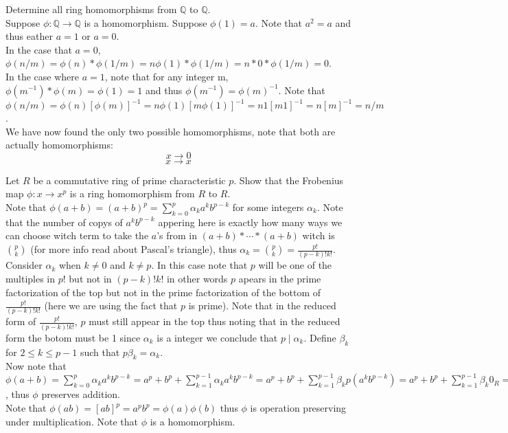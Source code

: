 \documentclass[12pt]{article}
\makeatletter
\theoremstyle{homework}
\newenvironment{exercise}[1]
{\def\@currentlabel{#1}\exercisecore}
{\endexercisecore}
\makeatother
\begin{document}
\begin{exercise}{15.42}
Determine all ring homomorphisms from $\mathbb{Q}$ to $\mathbb{Q}$.\\
Suppose $\phi:\mathbb{Q}\rightarrow\mathbb{Q}$ is a homomorphism.  Suppose $\phi(1)=a$.  Note that $a^2=a$ and thus eather $a=1$ or $a=0$.\\
In the case that $a=0$, $\phi(n/m)=\phi(n)*\phi(1/m)=n\phi(1)*\phi(1/m)=n*0*\phi(1/m)=0$.\\
In the case where $a=1$, note that for any integer m, $\phi(m^{-1})*\phi(m)=\phi(1)=1$ and thus $\phi(m^{-1})=\phi(m)^{-1}$.  Note that $\phi(n/m)=\phi(n)[\phi(m)]^{-1}=n\phi(1)[m\phi(1)]^{-1}=n1[m1]^{-1}=n[m]^{-1}=n/m$.\\
We have now found the only two possible homomorphisms, note that both are actually homomorphisms:
$$x\rightarrow 0$$
$$x\rightarrow x$$
\end{exercise}

\begin{exercise}{15.44}
Let $R$ be a commutative ring of prime characteristic $p$. Show that the Frobenius map $\phi : x \rightarrow x^p$ is a ring homomorphism from $R$ to $R$.\\
Note that $\phi(a+b)=(a+b)^p=\sum_{k=0}^p \alpha_k a^kb^{p-k}$ for some integers $\alpha_k$.  Note that the number of copys of $a^kb^{p-k}$ appering here is exactly how many ways we can choose witch term to take the $a$'s from in $(a+b)*\cdots *(a+b)$ witch is ${p}\choose{k}$ (for more info read about Pascal's triangle), thus $\alpha_k={{p}\choose{k}}=\frac{p!}{(p-k)!k!}$.\\
Consider $\alpha_k$ when $k\neq 0$ and $k\neq p$.  In this case note that $p$ will be one of the multiples in $p!$ but not in $(p-k)!k!$ in other words $p$ apears in the prime factorization of the top but not in the prime factorization of the bottom of $\frac{p!}{(p-k)!k!}$ (here we are using the fact that $p$ is prime).  Note that in the reduced form of $\frac{p!}{(p-k)!k!}$, $p$ must still appear in the top thus noting that in the reduced form the botom must be 1 since $\alpha_k$ is a integer we conclude that $p\mid \alpha_k$.  Define $\beta_k$ for $2\leq k\leq p-1$ such that $p\beta_k=\alpha_k$.\\
Now note that $\phi(a+b)=\sum_{k=0}^p \alpha_k a^kb^{p-k}=a^p+b^p+\sum_{k=1}^{p-1} \alpha_k a^kb^{p-k}=a^p+b^p+\sum_{k=1}^{p-1} \beta_k p (a^kb^{p-k})=a^p+b^p+\sum_{k=1}^{p-1} \beta_k 0_R=a^p+b^p=\phi(a)+\phi(b)$, thus $\phi$ preserves addition.\\
Note that $\phi(ab)=[ab]^p=a^pb^p=\phi(a)\phi(b)$ thus $\phi$ is operation preserving under multiplication.  Note that $\phi$ is a homomorphism.
\end{exercise}
\end{document}
